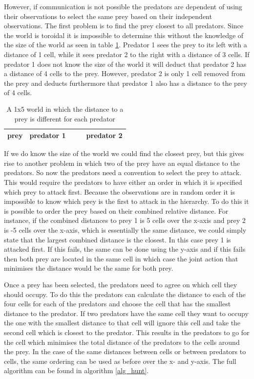 \documentclass[10pt]{article}
\begin{document}
However, if communication is not possible the predators are dependent of using their observations to select the same prey based on their independent observations. The first problem is to find the prey closest to all predators. Since the world is toroidal it is impossible to determine this without the knowledge of the size of the world as seen in table \ref{tab_disprob}. Predator 1 sees the prey to its left with a distance of 1 cell, while it sees predator 2 to the right with a distance of 3 cells. If predator 1 does not know the size of the world it will deduct that predator 2 has a distance of 4 cells to the prey. However, predator 2 is only 1 cell removed from the prey and deducts furthermore that predator 1 also has a distance to the prey of 4 cells.

\begin{table}[h!tb]
\centering
	\caption{A 1x5 world in which the distance to a prey is different for each predator}
\label{tab_disprob}
\begin{tabular}{|c|c|c|c|c|}
\hline
	prey & predator 1& & &predator 2 \\
\hline
\end{tabular}
\end{table}

If we do know the size of the world we could find the closest prey, but this gives rise to another problem in which two of the prey have an equal distance to the predators. So now the predators need a convention to select the prey to attack. This would require the predators to have either an order in which it is specified which prey to attack first. Because the observations are in random order it is impossible to know which prey is the first to attack in the hierarchy. To do this it is possible to order the prey based on their combined relative distance. For instance, if the combined distances to prey 1 is 5 cells over the x-axis and prey 2 is -5 cells over the x-axis, which is essentially the same distance, we could simply state that the largest combined distance is the closest. In this case prey 1 is attacked first. If this fails, the same can be done using the y-axis and if this fails then both prey are located in the same cell in which case the joint action that minimises the distance would be the same for both prey.

Once a prey has been selected, the predators need to agree on which cell they should occupy. To do this the predators can calculate the distance to each of the four cells for each of the predators and choose the cell that has the smallest distance to the predator. If two predators have the same cell they want to occupy the one with the smallest distance to that cell will ignore this cell and take the second cell which is closest to the predator. This results in the predators to go for the cell which minimises the total distance of the predators to the cells around the prey. In the case of the same distances between cells or between predators to cells, the same ordering can be used as before over the x- and y-axis. The full algorithm can be found in algorithm \ref{alg_hunt}.
\end{document}
